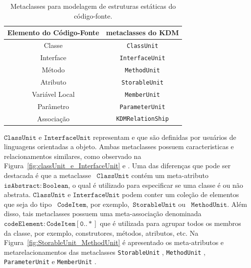 \begin{table}[h]
\centering
\caption{Metaclasses para modelagem de estruturas estáticas do código-fonte.}
\label{tab:meta_classes_pacoteCODE}
\begin{tabular}{|l|l|}
\hline
Elemento do Código-Fonte & metaclasses do KDM \\ \hline
\multicolumn{1}{|c|}{Classe}                   & \multicolumn{1}{|c|}{\texttt{ClassUnit}}           \\ \hline
\multicolumn{1}{|c|}{Interface}                & \multicolumn{1}{|c|}{\texttt{InterfaceUnit}}       \\ \hline
\multicolumn{1}{|c|}{Método}                   & \multicolumn{1}{|c|}{\texttt{MethodUnit}}          \\ \hline
\multicolumn{1}{|c|}{Atributo}                 & \multicolumn{1}{|c|}{\texttt{StorableUnit}}        \\ \hline
\multicolumn{1}{|c|}{Variável Local}           & \multicolumn{1}{|c|}{\texttt{MemberUnit}}          \\ \hline
\multicolumn{1}{|c|}{Parâmetro}                & \multicolumn{1}{|c|}{\texttt{ParameterUnit}}       \\ \hline
\multicolumn{1}{|c|}{Associação}               & \multicolumn{1}{|c|}{\texttt{KDMRelationShip}}     \\ \hline
\end{tabular}
\end{table}


$\mathtt{ClassUnit}$ e $\mathtt{InterfaceUnit}$ representam  e  que são definidas por usuários de linguagens orientadas a objeto. Ambas metaclasses possuem caracteristicas e relacionamentos similares, como observado na Figura~\ref{fig:classUnit_e_InterfaceUnit}  e . Uma das diferenças que pode ser destacada é que a metaclasse ~$\mathtt{ClassUnit}$ contém um meta-atributo~$\mathtt{isAbstract:Boolean}$, o qual é utilizado para especificar se uma classe é ou não abstrata. $\mathtt{ClassUnit}$ e $\mathtt{InterfaceUnit}$ podem conter um coleção de elementos que seja do tipo ~$\mathtt{CodeItem}$, por exemplo,~$\mathtt{StorableUnit}$ ou ~$\mathtt{MethodUnit}$. Além disso, tais metaclasses  possuem uma meta-associação denominada ~$\mathtt{codeElement:CodeItem[0..*]}$ que é utilizada para agrupar todos os membros da classe, por exemplo, construtores, métodos, atributos, etc. Na Figura~\ref{fig:StorableUnit_MethodUnit} é apresentado os meta-atributos e metarelacionamentos das metaclasses \texttt{StorableUnit} , \texttt{MethodUnit} , \texttt{ParameterUnit}  e \texttt{MemberUnit} .

